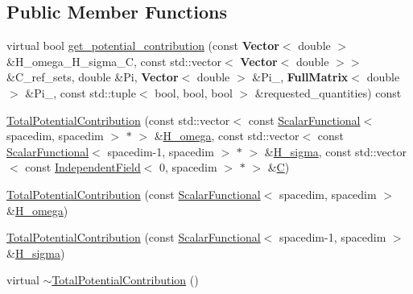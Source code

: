 \subsection*{Public Member Functions}
\begin{DoxyCompactItemize}
\item 
virtual bool \hyperlink{class_total_potential_contribution_a0d281fceeb90ece5c4d2655df5eb9948}{get\+\_\+potential\+\_\+contribution} (const {\bf Vector}$<$ double $>$ \&H\+\_\+omega\+\_\+\+H\+\_\+sigma\+\_\+C, const std\+::vector$<$ {\bf Vector}$<$ double $>$$>$ \&C\+\_\+ref\+\_\+sets, double \&Pi, {\bf Vector}$<$ double $>$ \&Pi\+\_, {\bf Full\+Matrix}$<$ double $>$ \&Pi\+\_, const std\+::tuple$<$ bool, bool, bool $>$ \&requested\+\_\+quantities) const 
\item 
\hyperlink{class_total_potential_contribution_a1932d6d7c269344542fc8e9221de4448}{Total\+Potential\+Contribution} (const std\+::vector$<$ const \hyperlink{class_scalar_functional}{Scalar\+Functional}$<$ spacedim, spacedim $>$ $\ast$ $>$ \&\hyperlink{class_total_potential_contribution_a15191539345978a3d0c7293bd7ecaa91}{H\+\_\+omega}, const std\+::vector$<$ const \hyperlink{class_scalar_functional}{Scalar\+Functional}$<$ spacedim-\/1, spacedim $>$ $\ast$ $>$ \&\hyperlink{class_total_potential_contribution_aac404e3a8493d9170541e34bd96673d3}{H\+\_\+sigma}, const std\+::vector$<$ const \hyperlink{class_independent_field}{Independent\+Field}$<$ 0, spacedim $>$ $\ast$ $>$ \&\hyperlink{class_total_potential_contribution_adea8f8f88243adec43df300e8c8d4593}{C})
\item 
\hyperlink{class_total_potential_contribution_ad64c449f4cae79fb8462f4679c50d606}{Total\+Potential\+Contribution} (const \hyperlink{class_scalar_functional}{Scalar\+Functional}$<$ spacedim, spacedim $>$ \&\hyperlink{class_total_potential_contribution_a15191539345978a3d0c7293bd7ecaa91}{H\+\_\+omega})
\item 
\hyperlink{class_total_potential_contribution_a4625ad0c798469b9da9bcb62cc0d00f6}{Total\+Potential\+Contribution} (const \hyperlink{class_scalar_functional}{Scalar\+Functional}$<$ spacedim-\/1, spacedim $>$ \&\hyperlink{class_total_potential_contribution_aac404e3a8493d9170541e34bd96673d3}{H\+\_\+sigma})
\item 
virtual \hyperlink{class_total_potential_contribution_af9ecccfc930f6826be4a903194541d5f}{$\sim$\+Total\+Potential\+Contribution} ()
\end{DoxyCompactItemize}
